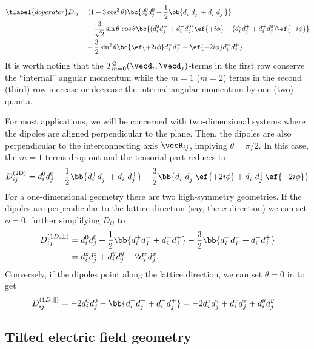 \begin{align}\tlabel{doperator}
    D_{ij} &= (1-3\cos^2 \theta) \bc{ d_i^0 d_j^0 + \frac{1}{2}\bb{d_i^+ d_j^- + d_i^- d_j^+} } \\
           &\quad -\frac{3}{\sqrt{2}}\sin\theta \,\cos\theta \bc{ (d_i^0 d_j^- + d_i^- d_j^0) \ef{+i\phi} - (d_i^0 d_j^+ + d_i^+ d_j^0) \ef{-i\phi} } \\
           &\quad -\frac{3}{2}\sin^2\theta \bc{ \ef{+2i\phi} d_i^- d_j^- + \ef{-2i\phi} d_i^+ d_j^+ }.
\end{align}
It is worth noting that the $T^2_{m=0}(\vecd_i, \vecd_j)$-terms in the first row conserve the ``internal'' angular momentum while the $m=1$ ($m=2$) terms in the second (third) row increase or decrease the internal angular momentum by one (two) quanta.

For most applications, we will be concerned with two-dimensional systems where the dipoles are aligned perpendicular to the plane. Then, the dipoles are also perpendicular to the interconnecting axis $\vecR_{ij}$, implying $\theta = \pi/2$. In this case, the $m=1$ terms drop out and the tensorial part reduces to
\begin{align}
    D^\text{(2D)}_{ij} = d_i^0 d_j^0 + \frac{1}{2}\bb{d_i^+ d_j^- + d_i^- d_j^+} -\frac{3}{2} \bb{ d_i^- d_j^- \ef{+2i\phi} + d_i^+ d_j^+ \ef{-2i\phi} }
\end{align}
For a one-dimensional geometry there are two high-symmetry geometries. If the dipoles are perpendicular to the lattice direction (say, the $x$-direction) we can set $\phi=0$, further simplifying $D_{ij}$ to
\begin{align}
    D_{ij}^{(1D,\perp)} &= d_i^0 d_j^0 + \frac{1}{2}\bb{d_i^+ d_j^- + d_i^- d_j^+} -\frac{3}{2} \bb{d_i^- d_j^- + d_i^+ d_j^+} \\
 &= d_i^z d_j^z + d_i^y d_j^y - 2 d_i^x d_j^x.
\end{align}
Conversely, if the dipoles point along the lattice direction, we can set $\theta=0$ in  to get
\begin{align}
    D^{(1D,\parallel)}_{ij} &= -2 d_i^0 d_j^0 - \bb{d_i^+ d_j^- + d_i^- d_j^+} = -2 d_i^z d_j^z+ d_i^x d_j^x + d_i^y d_j^y
\end{align}

\subsection{Tilted electric field geometry}

